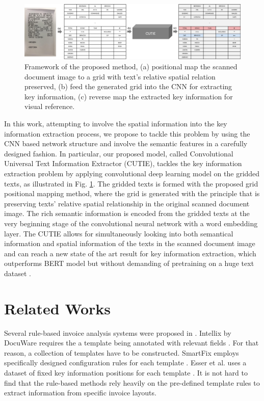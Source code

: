 \documentclass[10pt,twocolumn,letterpaper]{article}
\begin{document}
\begin{figure}
\begin{center}
\includegraphics[width=0.99\linewidth]{Model.jpg}
\end{center}
   \caption{Framework of the proposed method, (a) positional map the scanned document image to a grid with text's relative spatial relation preserved, (b) feed the generated grid into the CNN for extracting key information, (c) reverse map the extracted key information for visual reference.}
\label{fig:cutie}
\end{figure}
In this work, attempting to involve the spatial information into the key information extraction process, we propose to tackle this problem by using the CNN based network structure and involve the semantic features in a carefully designed fashion. In particular, our proposed model, called Convolutional Universal Text Information Extractor (CUTIE), tackles the key information extraction problem by applying convolutional deep learning model on the gridded texts, as illustrated in Fig. \ref{fig:cutie}. The gridded texts is formed with the proposed grid positional mapping method, where the grid is generated with the principle that is preserving texts’ relative spatial relationship in the original scanned document image. The rich semantic information is encoded from the gridded texts at the very beginning stage of the convolutional neural network with a word embedding layer. The CUTIE allows for simultaneously looking into both semantical information and spatial information of the texts in the scanned document image and can reach a new state of the art result for key information extraction, which outperforms BERT model but without demanding of pretraining on a huge text dataset \cite{bert,transformer}.


\section{Related Works}
Several rule-based invoice analysis systems were proposed in \cite{3,5,7}. Intellix by DocuWare requires the a template being annotated with relevant fields \cite{3}. For that reason, a collection of templates have to be constructed. SmartFix employs specifically designed configuration rules for each template \cite{5}. Esser et al. uses a dataset of fixed key information positions for each template \cite{7}. It is not hard to find that the rule-based methods rely heavily on the pre-defined template rules to extract information from specific invoice layouts.
\end{document}

